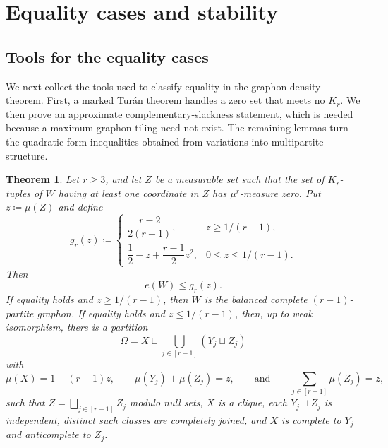 \documentclass[10pt]{article}
\numberwithin{equation}{section}
\newtheorem{theorem}{Theorem}[section]
\begin{document}
\section{Equality cases and stability}\label{sec:equality-stability}

\subsection{Tools for the equality cases}\label{sec:equality-tools}

We next collect the tools used to classify equality in the graphon density theorem.  First, a marked Tur\'an theorem handles a zero set that meets no $K_r$.  We then prove an approximate complementary-slackness statement, which is needed because a maximum graphon tiling need not exist.  The remaining lemmas turn the quadratic-form inequalities obtained from variations into multipartite structure.

\begin{theorem}\label{thm:ABHP-input}
Let $r\ge3$, and let $Z$ be a measurable set such that the set of $K_r$-tuples of $W$ having at least one coordinate in $Z$ has $\mu^r$-measure zero.  Put $z\coloneqq\mu(Z)$ and define
\[
 g_r(z)\coloneqq
 \begin{cases}
 \dfrac{r-2}{2(r-1)},&z\ge1/(r-1),\\[1.2ex]
 \dfrac12-z+\dfrac{r-1}{2}z^2,&0\le z\le1/(r-1).
 \end{cases}
\]
Then
\begin{equation}\label{eq:ABHP-bound}
 e(W)\le g_r(z).
\end{equation}
If equality holds and $z\ge1/(r-1)$, then $W$ is the balanced complete $(r-1)$-partite graphon.  If equality holds and $z\le1/(r-1)$, then, up to weak isomorphism, there is a partition
\[
 \Omega=X\sqcup\bigcup_{j\in[r-1]}(Y_j\sqcup Z_j)
\]
with
\[
 \mu(X)=1-(r-1)z,
 \qquad
 \mu(Y_j)+\mu(Z_j)=z,
 \qquad\text{and}\qquad
 \sum_{j\in[r-1]}\mu(Z_j)=z,
\]
such that $Z=\bigsqcup_{j\in[r-1]}Z_j$ modulo null sets, $X$ is a clique, each $Y_j\sqcup Z_j$ is independent, distinct such classes are completely joined, and $X$ is complete to $Y_j$ and anticomplete to $Z_j$.
\end{theorem}
\end{document}
